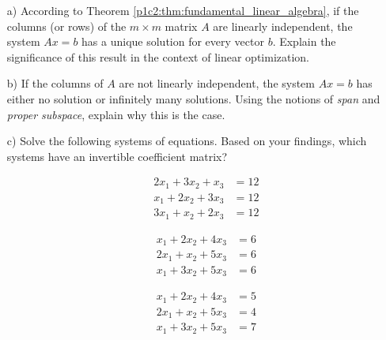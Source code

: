 \begin{itemize}
	\item[a)] According to Theorem \ref{p1c2:thm:fundamental_linear_algebra}, if the columns (or rows) of the $m \times m$ matrix $A$ are linearly independent, the system $Ax=b$ has a unique solution for every vector $b$. Explain the significance of this result in the context of linear optimization.
	\item[b)] If the columns of $A$ are not linearly independent, the system $Ax = b$ has either no solution or infinitely many solutions. Using the notions of \emph{span} and \emph{proper subspace}, explain why this is the case. 
	\item[c)] Solve the following systems of equations. Based on your findings, which systems have an invertible coefficient matrix?
	\begin{itemize}
		\item[] \begin{align*}
			2x_1 + 3x_2 + x_3 &= 12\\
			x_1 + 2x_2 + 3x_3 &= 12\\
			3x_1 + x_2 + 2x_3 &= 12
		\end{align*}
		\item[] \begin{align*}
			x_1 + 2x_2 + 4x_3 &= 6\\
			2x_1 + x_2 + 5x_3 &= 6\\
			x_1 + 3x_2 + 5x_3 &= 6
		\end{align*}
		\item[] \begin{align*}
			x_1 + 2x_2 + 4x_3 &= 5\\
			2x_1 + x_2 + 5x_3 &= 4\\
			x_1 + 3x_2 + 5x_3 &= 7
		\end{align*}
	\end{itemize}
\end{itemize}
